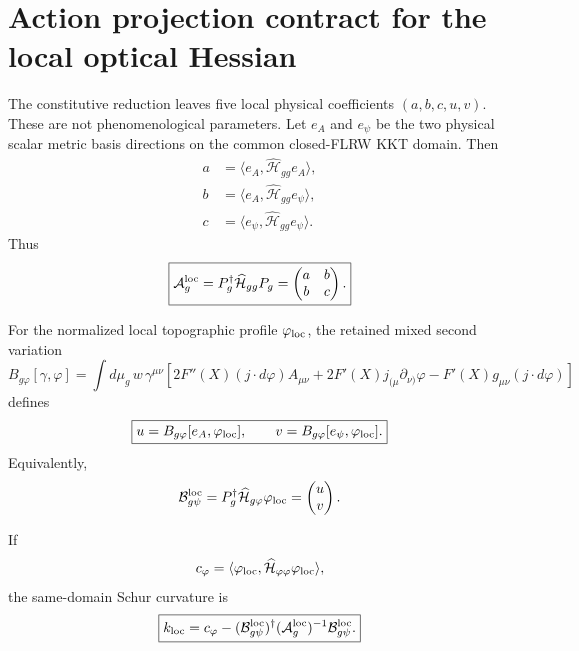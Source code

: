\section{Action projection contract for the local optical Hessian}
\label{sec:bhsm-optical-hessian-projection}

The constitutive reduction leaves five local physical coefficients
$(a,b,c,u,v)$.  These are not phenomenological parameters.  Let $e_A$ and
$e_\psi$ be the two physical scalar metric basis directions on the common
closed-FLRW KKT domain.  Then
\begin{align}
a&=\langle e_A,\widehat{\mathcal H}_{gg}e_A\rangle,\\
b&=\langle e_A,\widehat{\mathcal H}_{gg}e_\psi\rangle,\\
c&=\langle e_\psi,\widehat{\mathcal H}_{gg}e_\psi\rangle.
\end{align}
Thus
\begin{equation}
\boxed{
\mathcal A_g^{\rm loc}
=
P_g^\dagger\widehat{\mathcal H}_{gg}P_g
=
\begin{pmatrix}a&b\\b&c\end{pmatrix}.
}
\end{equation}

For the normalized local topographic profile $\varphi_{\rm loc}$, the retained
mixed second variation
\begin{equation}
B_{g\varphi}[\gamma,\varphi]
=
\int d\mu_g\,w\,\gamma^{\mu\nu}
\left[
2F''(X)(j\!\cdot\!d\varphi)A_{\mu\nu}
+
2F'(X)j_{(\mu}\partial_{\nu)}\varphi
-
F'(X)g_{\mu\nu}(j\!\cdot\!d\varphi)
\right]
\end{equation}
defines
\begin{equation}
\boxed{
u=B_{g\varphi}[e_A,\varphi_{\rm loc}],
\qquad
v=B_{g\varphi}[e_\psi,\varphi_{\rm loc}].
}
\end{equation}
Equivalently,
\begin{equation}
\mathcal B_{g\psi}^{\rm loc}
=
P_g^\dagger\widehat{\mathcal H}_{g\varphi}\varphi_{\rm loc}
=
\begin{pmatrix}u\\v\end{pmatrix}.
\end{equation}

If
\begin{equation}
c_\varphi
=
\langle\varphi_{\rm loc},
\widehat{\mathcal H}_{\varphi\varphi}\varphi_{\rm loc}\rangle,
\end{equation}
the same-domain Schur curvature is
\begin{equation}
\boxed{
k_{\rm loc}
=
c_\varphi
-
(\mathcal B_{g\psi}^{\rm loc})^\dagger
(\mathcal A_g^{\rm loc})^{-1}
\mathcal B_{g\psi}^{\rm loc}.
}
\end{equation}

